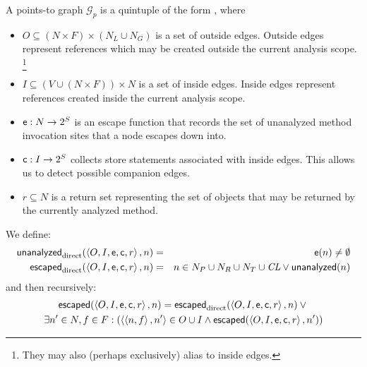 \documentclass[11pt,notitlepage]{article}
\newcommand{\bigvar}[1]{\ensuremath{\text{\it #1}}}
\newcommand{\func}[1]{\ensuremath{\text{\sffamily #1}}}
\begin{document}
A points-to graph $\mathcal{G}_p$ is a quintuple of the form \tuple{O,I,\func{e},\func{c},r}, where
\begin{itemize}
\item $O \subseteq (N\times F)\times(N_L \cup N_G)$ is a set of
outside edges.  Outside edges represent references which may be
created outside the current analysis scope.%
\footnote{They may also (perhaps exclusively) alias to inside edges.}
\item $I \subseteq (V\cup(N\times F))\times N$ is a set of inside
edges.  Inside edges represent references created inside the current
analysis scope.
\item $\func{e}:N\to 2^S$ is an escape function that records the set of
unanalyzed method invocation sites that a node escapes down into.
\item $\func{c}:I\to 2^S$ collects store statements associated with
inside edges.  This allows us to detect possible companion edges.
\item $r \subseteq N$ is a return set representing the set of objects
that may be returned by the currently analyzed method.
\end{itemize}
We define:
\begin{eqnarray*}
\func{unanalyzed}_\text{direct}(\tuple{O,I,\func{e},\func{c},r}, n) &=&
\func{e}(n)\neq\emptyset
\\
\func{escaped}_\text{direct}(\tuple{O,I,\func{e},\func{c},r}, n) &=&
 n\in N_P \cup N_R \cup N_T \cup \bigvar{CL}
 \vee
 \func{unanalyzed}(n)
\end{eqnarray*}
and then recursively:
\begin{multline*}
\func{escaped}%
              (\tuple{O,I,\func{e},\func{c},r},n) =
 \func{escaped}_\text{direct}(\tuple{O,I,\func{e},\func{c},r},n) \vee {}
\\
 \exists n'\in N,f\in F : \left(\tuple{\tuple{n,f},n'}\in O\cup I
 \wedge
 \func{escaped}%
               (\tuple{O,I,\func{e},\func{c},r},n')\right)
\end{multline*}
\end{document}
